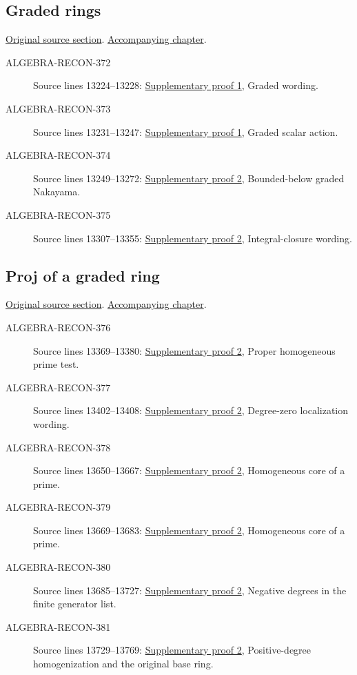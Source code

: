 \subsection{Graded rings}
\hypertarget{algebra-source-section-graded}{}
\noindent\href{https://github.com/stacks/stacks-project/blob/a04446e57ec1fbc252a871afcec7752fb2807b14/algebra.tex\#L13199}{Original source section}. \href{algebra.pdf\#nameddest=section-graded}{Accompanying chapter}.

\begin{description}
\item[ALGEBRA-RECON-372] Source lines 13224--13228: \hyperlink{algebra_localization_kgroups_graded_notes_20260927}{Supplementary proof 1}, Graded wording.
\item[ALGEBRA-RECON-373] Source lines 13231--13247: \hyperlink{algebra_localization_kgroups_graded_notes_20260927}{Supplementary proof 1}, Graded scalar action.
\item[ALGEBRA-RECON-374] Source lines 13249--13272: \hyperlink{algebra_graded_proj_hilbert_notes_20260927}{Supplementary proof 2}, Bounded-below graded Nakayama.
\item[ALGEBRA-RECON-375] Source lines 13307--13355: \hyperlink{algebra_graded_proj_hilbert_notes_20260927}{Supplementary proof 2}, Integral-closure wording.
\end{description}

\subsection{Proj of a graded ring}
\hypertarget{algebra-source-section-proj}{}
\noindent\href{https://github.com/stacks/stacks-project/blob/a04446e57ec1fbc252a871afcec7752fb2807b14/algebra.tex\#L13364}{Original source section}. \href{algebra.pdf\#nameddest=section-proj}{Accompanying chapter}.

\begin{description}
\item[ALGEBRA-RECON-376] Source lines 13369--13380: \hyperlink{algebra_graded_proj_hilbert_notes_20260927}{Supplementary proof 2}, Proper homogeneous prime test.
\item[ALGEBRA-RECON-377] Source lines 13402--13408: \hyperlink{algebra_graded_proj_hilbert_notes_20260927}{Supplementary proof 2}, Degree-zero localization wording.
\item[ALGEBRA-RECON-378] Source lines 13650--13667: \hyperlink{algebra_graded_proj_hilbert_notes_20260927}{Supplementary proof 2}, Homogeneous core of a prime.
\item[ALGEBRA-RECON-379] Source lines 13669--13683: \hyperlink{algebra_graded_proj_hilbert_notes_20260927}{Supplementary proof 2}, Homogeneous core of a prime.
\item[ALGEBRA-RECON-380] Source lines 13685--13727: \hyperlink{algebra_graded_proj_hilbert_notes_20260927}{Supplementary proof 2}, Negative degrees in the finite generator list.
\item[ALGEBRA-RECON-381] Source lines 13729--13769: \hyperlink{algebra_graded_proj_hilbert_notes_20260927}{Supplementary proof 2}, Positive-degree homogenization and the original base ring.
\end{description}

